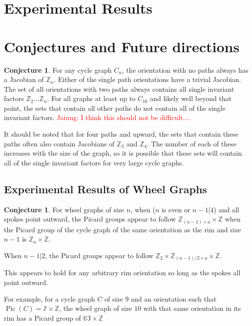 \documentclass[11pt,reqno]{amsart}
\DeclareMathOperator{\Pic}{Pic}
\theoremstyle{definition}
\newtheorem{conj}[mydef]{Conjecture}
\theoremstyle{plain}
\begin{document}
\section{Experimental Results}

\section{Conjectures and Future directions}

	\begin{conj}
		For any cycle graph $C_n$, the orientation with no paths always has a Jacobian of $\mathbb{Z}_n$.
		Either of the single path orientations have a trivial Jacobian.
		The set of all orientations with two paths always contains all single invariant factors
		$\mathbb{Z}_2\dots\mathbb{Z}_n$.  For all graphs at least up to $C_{10}$ and likely well beyond that
		point, the sets that contain all other paths do not contain all of the single invariant factors. \textcolor{red}{Jaiung: I think this should not be difficult....}
	\end{conj}

It should be noted that for four paths and upward, the sets that contain these paths often also contain
Jacobians of $\mathbb{Z}_3$ and $\mathbb{Z}_4$.  The number of each of these increases with the size of the
graph, so it is possible that these sets will contain all of the single invariant factors for very
large cycle graphs.

\subsection{Experimental Results of Wheel Graphs}

	\begin{conj}
		For wheel graphs of size $n$, when ($n$ is even or $n-1 | 4$) and all spokes point outward, the Picard groups appear to follow
		$\mathbb{Z}_{(n-1) \times a} \times \mathbb{Z}$ when the Picard group of the cycle graph of the same orientation as the rim
		and size $n-1$ is $\mathbb{Z}_a \times \mathbb{Z}$.

		When $n-1 | 2$, the Picard groups appear to follow $\mathbb{Z}_2 \times \mathbb{Z}_{(n-1)/2 \times a} \times \mathbb{Z}$.
	\end{conj}

	This appears to hold for any arbitrary rim orientation so long as the spokes all point outward.

	For example, for a cycle graph $C$ of size $9$ and an orientation such that $\Pic(C) = \mathbb{7} \times \mathbb{Z}$,
	the wheel graph of size $10$ with that same orientation in its rim has a Picard group of $\mathbb{63} \times \mathbb{Z}$



\end{document}
